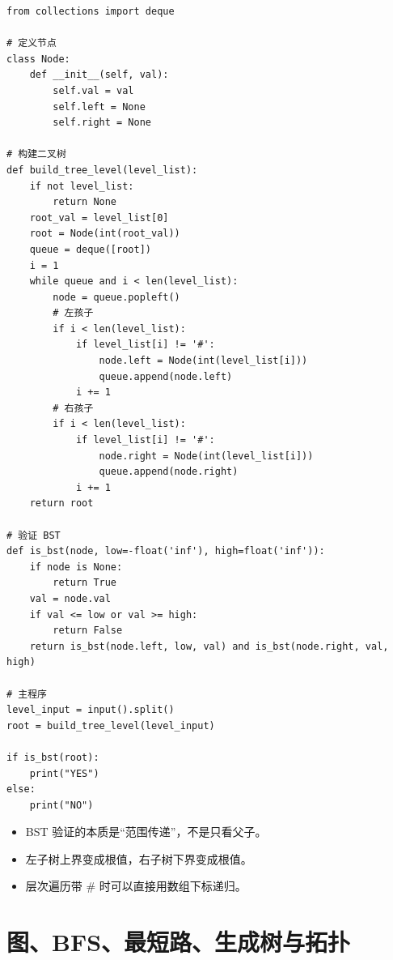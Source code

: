 \documentclass[10pt,a4paper,fontset=none]{ctexart}
\begin{document}
\begin{lstlisting}[style=py,caption={最终可用代码（对话来源）}]
from collections import deque

# 定义节点
class Node:
    def __init__(self, val):
        self.val = val
        self.left = None
        self.right = None

# 构建二叉树
def build_tree_level(level_list):
    if not level_list:
        return None
    root_val = level_list[0]
    root = Node(int(root_val))
    queue = deque([root])
    i = 1
    while queue and i < len(level_list):
        node = queue.popleft()
        # 左孩子
        if i < len(level_list):
            if level_list[i] != '#':
                node.left = Node(int(level_list[i]))
                queue.append(node.left)
            i += 1
        # 右孩子
        if i < len(level_list):
            if level_list[i] != '#':
                node.right = Node(int(level_list[i]))
                queue.append(node.right)
            i += 1
    return root

# 验证 BST
def is_bst(node, low=-float('inf'), high=float('inf')):
    if node is None:
        return True
    val = node.val
    if val <= low or val >= high:
        return False
    return is_bst(node.left, low, val) and is_bst(node.right, val, high)

# 主程序
level_input = input().split()
root = build_tree_level(level_input)

if is_bst(root):
    print("YES")
else:
    print("NO")
\end{lstlisting}
\begin{notebox}
\begin{itemize}
  \item BST 验证的本质是“范围传递”，不是只看父子。
  \item 左子树上界变成根值，右子树下界变成根值。
  \item 层次遍历带 \# 时可以直接用数组下标递归。
\end{itemize}
\end{notebox}

\section{图、BFS、最短路、生成树与拓扑}
\end{document}
